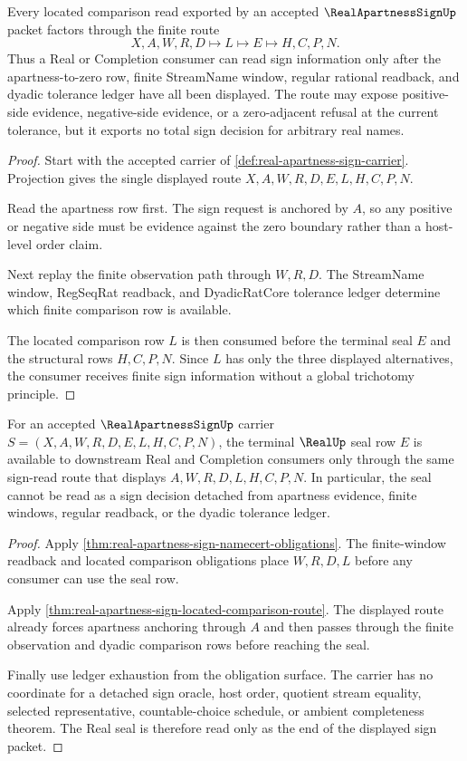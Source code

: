 \begin{theorem}
\label{thm:real-apartness-sign-located-comparison-route}
Every located comparison read exported by an accepted $\RealApartnessSignUp$ packet factors through the finite route
$$
X,A,W,R,D \longmapsto L \longmapsto E \longmapsto H,C,P,N .
$$
Thus a Real or Completion consumer can read sign information only after the apartness-to-zero row, finite StreamName window, regular rational readback, and dyadic tolerance ledger have all been displayed. The route may expose positive-side evidence, negative-side evidence, or a zero-adjacent refusal at the current tolerance, but it exports no total sign decision for arbitrary real names.
\end{theorem}
\begin{proof}
Start with the accepted carrier of \autoref{def:real-apartness-sign-carrier}. Projection gives the single displayed route $X,A,W,R,D,E,L,H,C,P,N$.

Read the apartness row first. The sign request is anchored by $A$, so any positive or negative side must be evidence against the zero boundary rather than a host-level order claim.

Next replay the finite observation path through $W,R,D$. The StreamName window, RegSeqRat readback, and DyadicRatCore tolerance ledger determine which finite comparison row is available.

The located comparison row $L$ is then consumed before the terminal seal $E$ and the structural rows $H,C,P,N$. Since $L$ has only the three displayed alternatives, the consumer receives finite sign information without a global trichotomy principle.
\end{proof}

\begin{theorem}
\label{thm:real-apartness-sign-real-seal}
For an accepted $\RealApartnessSignUp$ carrier $S=(X,A,W,R,D,E,L,H,C,P,N)$, the terminal $\RealUp$ seal row $E$ is available to downstream Real and Completion consumers only through the same sign-read route that displays $A,W,R,D,L,H,C,P,N$. In particular, the seal cannot be read as a sign decision detached from apartness evidence, finite windows, regular readback, or the dyadic tolerance ledger.
\end{theorem}
\begin{proof}
Apply \autoref{thm:real-apartness-sign-namecert-obligations}. The finite-window readback and located comparison obligations place $W,R,D,L$ before any consumer can use the seal row.

Apply \autoref{thm:real-apartness-sign-located-comparison-route}. The displayed route already forces apartness anchoring through $A$ and then passes through the finite observation and dyadic comparison rows before reaching the seal.

Finally use ledger exhaustion from the obligation surface. The carrier has no coordinate for a detached sign oracle, host order, quotient stream equality, selected representative, countable-choice schedule, or ambient completeness theorem. The Real seal is therefore read only as the end of the displayed sign packet.
\end{proof}

